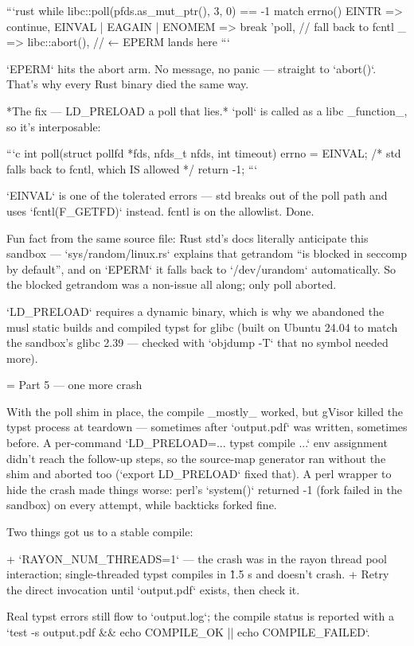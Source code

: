 ```rust
while libc::poll(pfds.as_mut_ptr(), 3, 0) == -1 {
    match errno() {
        EINTR => continue,
        EINVAL | EAGAIN | ENOMEM => break 'poll,  // fall back to fcntl
        _ => libc::abort(),                       // ← EPERM lands here
    }
}
```

`EPERM` hits the abort arm. No message, no panic — straight to `abort()`.
That's why every Rust binary died the same way.

*The fix — LD_PRELOAD a poll that lies.* `poll` is called as a libc
_function_, so it's interposable:

```c
int poll(struct pollfd *fds, nfds_t nfds, int timeout) {
    errno = EINVAL;      /* std falls back to fcntl, which IS allowed */
    return -1;
}
```

`EINVAL` is one of the tolerated errors — std breaks out of the poll path and
uses `fcntl(F_GETFD)` instead. fcntl is on the allowlist. Done.

Fun fact from the same source file: Rust std's docs literally anticipate this
sandbox — `sys/random/linux.rs` explains that getrandom “is blocked in
seccomp by default”, and on `EPERM` it falls back to `/dev/urandom`
automatically. So the blocked getrandom was a non-issue all along; only poll
aborted.

`LD_PRELOAD` requires a dynamic binary, which is why we abandoned the musl
static builds and compiled typst for glibc (built on Ubuntu 24.04 to match
the sandbox's glibc 2.39 — checked with `objdump -T` that no symbol needed
more).

= Part 5 — one more crash

With the poll shim in place, the compile _mostly_ worked, but gVisor killed
the typst process at teardown — sometimes after `output.pdf` was written,
sometimes before. A per-command `LD_PRELOAD=... typst compile ...` env
assignment didn't reach the follow-up steps, so the source-map generator ran
without the shim and aborted too (`export LD_PRELOAD` fixed that). A perl
wrapper to hide the crash made things worse: perl's `system()` returned -1
(fork failed in the sandbox) on every attempt, while backticks forked fine.

Two things got us to a stable compile:

+ `RAYON_NUM_THREADS=1` — the crash was in the rayon thread pool
  interaction; single-threaded typst compiles in \~1.5 s and doesn't crash.
+ Retry the direct invocation until `output.pdf` exists, then check it.

Real typst errors still flow to `output.log`; the compile status is reported
with a `test -s output.pdf && echo COMPILE_OK || echo COMPILE_FAILED`.

